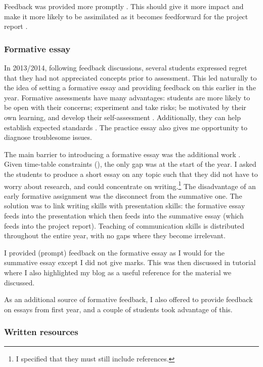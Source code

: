 Feedback was provided more promptly \citep{Gibbs2015}. This should give it more impact and make it more likely to be assimilated as it becomes feedforward for the project report \citep{Housell2003,Bloxham2015}.

\subsubsection{Formative essay}\label{sec:formative}

In 2013/2014, following feedback discussions, several students expressed regret that they had not appreciated concepts prior to assessment. This led naturally to the idea of setting a formative essay and providing feedback on this earlier in the year. Formative assessments have many advantages: students are more likely to be open with their concerns; experiment and take risks; be motivated by their own learning, and develop their self-assessment \citep[chapter 1, and references therein]{Irons2008}. Additionally, they can help establish expected standards \citep[chapter 10]{Ramsden1992}. The practice essay also gives me opportunity to diagnose troublesome issues.

The main barrier to introducing a formative essay was the additional work \citep[chapter 4]{Irons2008}. Given time-table constraints (), the only gap was at the start of the year. I asked the students to produce a short essay on any topic such that they did not have to worry about research, and could concentrate on writing.\footnote{I specified that they must still include references.} The disadvantage of an early formative assignment was the disconnect from the summative one. The solution was to link writing skills with presentation skills: the formative essay feeds into the presentation which then feeds into the summative essay (which feeds into the project report). Teaching of communication skills is distributed throughout the entire year, with no gaps where they become irrelevant.

I provided (prompt) feedback on the formative essay as I would for the summative essay except I did not give marks. This was then discussed in tutorial where I also highlighted my blog as a useful reference for the material we discussed.

As an additional source of formative feedback, I also offered to provide feedback on essays from first year, and a couple of students took advantage of this.

\subsubsection{Written resources}\label{sec:blog}

